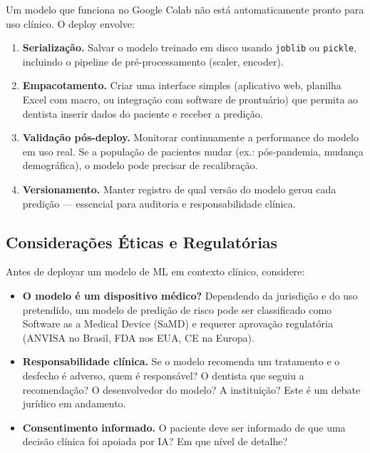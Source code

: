 Um modelo que funciona no Google Colab não está automaticamente pronto para uso clínico. O deploy  envolve:

\begin{enumerate}
    \item \textbf{Serialização.} Salvar o modelo treinado em disco usando \texttt{joblib} ou \texttt{pickle}, incluindo o pipeline de pré-processamento (scaler, encoder).
    \item \textbf{Empacotamento.} Criar uma interface simples (aplicativo web, planilha Excel com macro, ou integração com software de prontuário) que permita ao dentista inserir dados do paciente e receber a predição.
    \item \textbf{Validação pós-deploy.} Monitorar continuamente a performance do modelo em uso real. Se a população de pacientes mudar (ex.: pós-pandemia, mudança demográfica), o modelo pode precisar de recalibração.
    \item \textbf{Versionamento.} Manter registro de qual versão do modelo gerou cada predição — essencial para auditoria e responsabilidade clínica.
\end{enumerate}

\subsection{Considerações Éticas e Regulatórias}

Antes de deployar um modelo de ML em contexto clínico, considere:

\begin{itemize}
    \item \textbf{O modelo é um dispositivo médico?} Dependendo da jurisdição e do uso pretendido, um modelo de predição de risco pode ser classificado como Software as a Medical Device (SaMD) e requerer aprovação regulatória (ANVISA no Brasil, FDA nos EUA, CE na Europa).
    \item \textbf{Responsabilidade clínica.} Se o modelo recomenda um tratamento e o desfecho é adverso, quem é responsável? O dentista que seguiu a recomendação? O desenvolvedor do modelo? A instituição? Este é um debate jurídico em andamento.
    \item \textbf{Consentimento informado.} O paciente deve ser informado de que uma decisão clínica foi apoiada por IA? Em que nível de detalhe?
\end{itemize}


